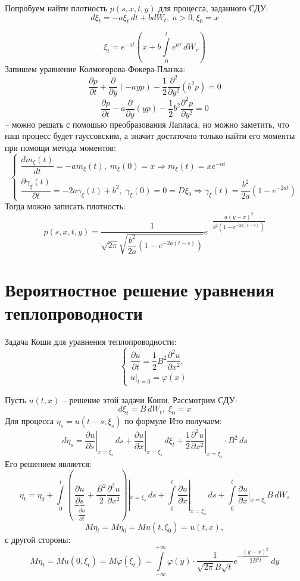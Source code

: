 \begin{ex}
  Попробуем найти плотность $p(s, x, t, y)$ для процесса, заданного СДУ:
  \[
    d\xi_t = - a \xi_t \, dt + b dW_t, \; a>0, \xi_0 = x
  \]

  \[
    \xi_t = e^{-at} \left( x + b \int\limits_0^t e^{a\tau} \, dW_\tau \right)
  \]
  Запишем уравнение Колмогорова-Фокера-Планка:
  \[
    \dfrac{\partial p}{\partial t} + \dfrac{\partial }{\partial y}(- a y p) - \dfrac{1}{2} \dfrac{\partial^2}{\partial y^2} (b^2 p) = 0
  \]
  \[
    \dfrac{\partial p}{\partial t} - a \dfrac{\partial }{\partial y} (y p) - \dfrac{1}{2} b^2 \dfrac{\partial^2 p}{\partial y^2} = 0
  \]
  -- можно решать с помошью преобразования Лапласа, но можно заметить, что
  наш процесс будет гауссовским, а значит достаточно только найти его моменты
  при помощи метода моментов:
  \[
    \begin{cases}
      \dfrac{d m_\xi(t)}{dt} = - a m_\xi(t), \; m_\xi(0) = x \Rightarrow m_\xi(t) = x e^{-at} \\
      \dfrac{\partial \gamma_\xi(t)}{\partial t} = - 2a \gamma_\xi(t) + b^2, \; \gamma_\xi(0) = 0 = D\xi_0 \Rightarrow \gamma_\xi(t) = \dfrac{b^2}{2a} \left( 1 - e^{-2at} \right)
    \end{cases}
  \]
  Тогда можно записать плотность:
  \[
    p(s, x, t, y) = \dfrac{1}{\sqrt{2\pi} \sqrt{ \dfrac{b^2}{2a} \left( 1 - e^{-2a(t-s)} \right)  }} e^{- \dfrac{a(y-x)^2}{b^2 \left( 1 - e^{-2a(t-s)} \right) }}
  \]
\end{ex}

\section{Вероятностное решение уравнения теплопроводности}

Задача Коши для уравнения теплопроводности:
\[
  \begin{cases}
    \dfrac{\partial u}{\partial t} = \dfrac{1}{2} B^2 \dfrac{\partial^2 u}{\partial x^2}, \\
    u |_{t = 0} = \varphi(x)
  \end{cases}
\]

Пусть $u(t, x)$ -- решение этой задачи Коши. Рассмотрим СДУ:
\[
  d\xi_t = B \, dW_t, \; \xi_0 = x
\]
Для процесса $\eta_s = u(t-s, \xi_s)$ по формуле Ито получаем:
\[
  d\eta_s = \left. \dfrac{\partial u}{\partial s} \right|_{x=\xi_s} \, ds +
    \left. \dfrac{\partial u}{\partial x} \right|_{x = \xi_s} \, d\xi_t +
      \left. \dfrac{1}{2} \dfrac{\partial^2 u}{\partial x^2} \right|_{x = \xi_s} \cdot B^2 \, ds 
\]
Его решением является:
\[
  \eta_t = \eta_0 + \int\limits_0^t \left( \underbrace{\dfrac{\partial u}{\partial s}}_{ -\dfrac{\partial u}{\partial t}  } +\dfrac{B^2}{2} \dfrac{\partial^2 u}{\partial x^2}  \right) |_{x = \xi_s} \, ds + \int\limits_0^t \dfrac{\partial u}{\partial x} |_{x = \xi_s} \, ds + \int\limits_0^t \dfrac{\partial u}{\partial x} |_{x = \xi_s} B \, dW_s 
\]
\[
  M\eta_t = M\eta_0 = M u(t, \xi_0) = u(t, x),
\]
с другой стороны:
\[
  M\eta_t = M u(0, \xi_t) = M \varphi(\xi_t) = \int\limits_{-\infty}^{+\infty} \varphi(y) \cdot \dfrac{1}{\sqrt{2\pi} B \sqrt{t}} e^{- \dfrac{(y-x)^2}{2B^2 t}} \, dy
\]

